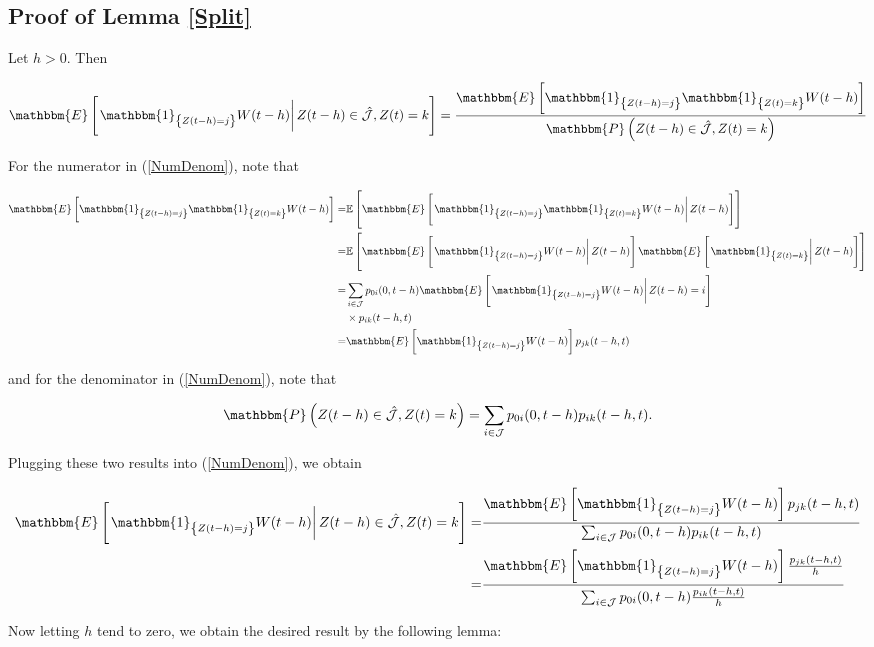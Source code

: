 \documentclass{article}
\newcommand{\1}[1]{\mathbbm{1}_{\left\lbrace #1 \right\rbrace}}
\newcommand{\expec}[1][def]{\mathbbm{E} \left[ #1 \right]}
\newcommand{\econd}[2][def]{\mathbbm{E} \left[ \left. #1 \right| #2 \right]}
\newcommand{\probability}[1][def]{\mathbbm{P} \left( #1 \right)}
\theoremstyle{break}
\theoremstyle{remark}
\numberwithin{equation}{section}
\begin{document}
\newpage

\begin{appendices}

\section{Proof of Lemma \ref{Split}} \label{SplitProof}

Let $h>0$. Then

\begin{align} \label{NumDenom}
	\econd[\1{Z(t-h)=j} W(t-h)]{Z(t-h) \in \hat{\mathcal{J}}, Z(t) = k} = \frac{\expec[\1{Z(t-h)=j} \1{Z(t)=k} W(t-h)]}{\probability[Z(t-h) \in \hat{\mathcal{J}}, Z(t)=k]}
\end{align}

For the numerator in (\ref{NumDenom}), note that 

\begin{align*}
	\expec[\1{Z(t-h)=j} \1{Z(t)=k} W(t-h)] =& \mathbb{E} \left[ \econd[\1{Z(t-h)=j} \1{Z(t)=k} W(t-h)]{Z(t-h)} \right] \\
	=& \mathbb{E} \left[ \econd[\1{Z(t-h)=j} W(t-h)]{Z(t-h)} \econd[\1{Z(t)=k}]{Z(t-h)} \right] \\
	=& \sum_{i \in \mathcal{J}} p_{0i}(0,t-h) \econd[\1{Z(t-h)=j} W(t-h)]{Z(t-h)=i} \\
	&\times p_{ik}(t-h,t) \\
	=& \expec[\1{Z(t-h)=j} W(t-h)] p_{jk}(t-h,t)
\end{align*}

and for the denominator in (\ref{NumDenom}), note that 


\begin{align*}
	\probability[Z(t-h) \in \hat{\mathcal{J}}, Z(t)=k] = \sum_{i \in \mathcal{J}} p_{0i}(0,t-h) p_{ik}(t-h,t).
\end{align*}

Plugging these two results into (\ref{NumDenom}), we obtain

\begin{align*}
	\econd[\1{Z(t-h)=j} W(t-h)]{Z(t-h) \in \hat{\mathcal{J}}, Z(t) = k} =& \frac{\expec[\1{Z(t-h)=j} W(t-h)] p_{jk}(t-h,t)}{\sum_{i \in \mathcal{J}} p_{0i}(0,t-h) p_{ik}(t-h,t)} \\
	=& \frac{\expec[\1{Z(t-h)=j} W(t-h)] \frac{p_{jk}(t-h,t)}{h}}{\sum_{i \in \mathcal{J}} p_{0i}(0,t-h) \frac{p_{ik}(t-h,t)}{h}} \\
\end{align*}

Now letting $h$ tend to zero, we obtain the desired result by the following lemma:


\end{appendices}
\end{document}
